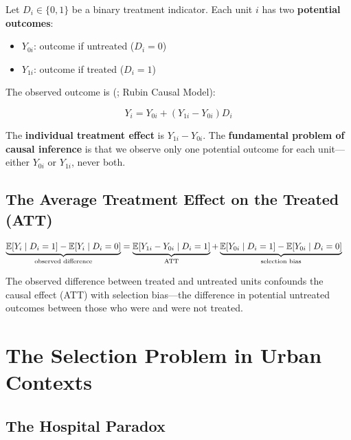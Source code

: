 Let $D_i \in \{0,1\}$ be a binary treatment indicator. Each unit $i$ has
two \textbf{potential outcomes}:
\begin{itemize}
  \item $Y_{0i}$: outcome if untreated ($D_i = 0$)
  \item $Y_{1i}$: outcome if treated ($D_i = 1$)
\end{itemize}

The observed outcome is (\citealt{Holland1986}; Rubin Causal Model):

\begin{tcolorbox}[keyresult]
\begin{equation}
  Y_i = Y_{0i} + (Y_{1i} - Y_{0i})D_i
  \label{eq_PotentialOutcomes}
\end{equation}
\end{tcolorbox}

The \textbf{individual treatment effect} is $Y_{1i} - Y_{0i}$. The
\textbf{fundamental problem of causal inference} is that we observe only one
potential outcome for each unit---either $Y_{0i}$ or $Y_{1i}$, never both.

\subsection{The Average Treatment Effect on the Treated (ATT)}

\begin{tcolorbox}[keyresult]
\begin{align}
  \underbrace{\mathbb{E}[Y_i \mid D_i=1] - \mathbb{E}[Y_i \mid D_i=0]}_{\text{observed difference}}
  &= \underbrace{\mathbb{E}[Y_{1i} - Y_{0i} \mid D_i=1]}_{\text{ATT}}
   + \underbrace{\mathbb{E}[Y_{0i} \mid D_i=1] - \mathbb{E}[Y_{0i} \mid D_i=0]}_{\text{selection bias}}
  \label{eq_ATT}
\end{align}
\end{tcolorbox}

The observed difference between treated and untreated units confounds the
causal effect (ATT) with selection bias---the difference in potential
untreated outcomes between those who were and were not treated.


\section{The Selection Problem in Urban Contexts}
\label{sec_Selection}

\subsection{The Hospital Paradox}


